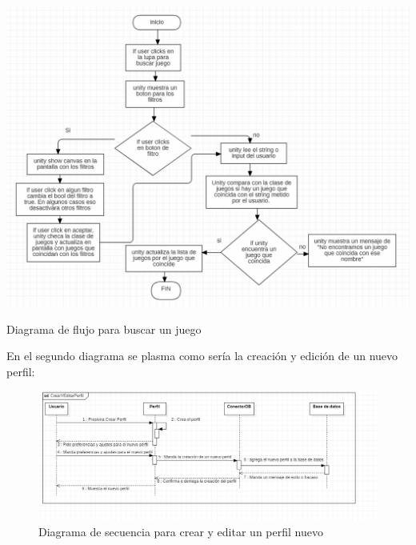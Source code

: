 \documentclass[12pt, oneside, letterpaper]{book}
\begin{document}
\begin{center}
	\centering
		\includegraphics[width=1.2\textwidth]{DFFNBuscarJuego.png}

	\caption{Diagrama de flujo para buscar un juego}
	\label{DFFNBuscarJuego}
\end{center}
\bigskip
\fontsize{14}{18}\selectfont
\par 
En el segundo diagrama se plasma como sería la creación y edición de un nuevo perfil:

\begin{figure}[h]
    \begin{flushleft}
        \includegraphics[width=1.2\textwidth]{DSFNCrearYEditarPerfil.png}
        \caption{Diagrama de secuencia para crear y editar un perfil nuevo}
        \label{DSFNCrearYEditarPerfil}
    \end{flushleft}
\end{figure}
\end{document}
